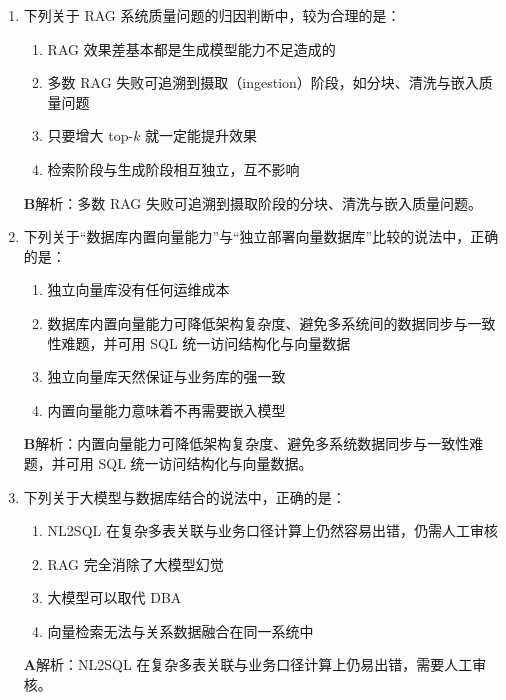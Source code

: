 \documentclass[UTF8,a4paper,11pt]{ctexart}
\newenvironment{answer}%
  {\begin{ans}\noindent{\bfseries\color{ansframe}【答案】}\hspace{0.4em}}%
  {\end{ans}}
\begin{document}
\begin{enumerate}
\item 下列关于 RAG 系统质量问题的归因判断中，较为合理的是：
\begin{enumerate}[label=\Alph*., leftmargin=2.2em, itemsep=1pt]
\item RAG 效果差基本都是生成模型能力不足造成的
\item 多数 RAG 失败可追溯到摄取（ingestion）阶段，如分块、清洗与嵌入质量问题
\item 只要增大 top-$k$ 就一定能提升效果
\item 检索阶段与生成阶段相互独立，互不影响
\end{enumerate}
\begin{answer}
\textbf{B}\quad 解析：多数 RAG 失败可追溯到摄取阶段的分块、清洗与嵌入质量问题。
\end{answer}

\item 下列关于“数据库内置向量能力”与“独立部署向量数据库”比较的说法中，正确的是：
\begin{enumerate}[label=\Alph*., leftmargin=2.2em, itemsep=1pt]
\item 独立向量库没有任何运维成本
\item 数据库内置向量能力可降低架构复杂度、避免多系统间的数据同步与一致性难题，并可用 SQL 统一访问结构化与向量数据
\item 独立向量库天然保证与业务库的强一致
\item 内置向量能力意味着不再需要嵌入模型
\end{enumerate}
\begin{answer}
\textbf{B}\quad 解析：内置向量能力可降低架构复杂度、避免多系统数据同步与一致性难题，并可用 SQL 统一访问结构化与向量数据。
\end{answer}

\item 下列关于大模型与数据库结合的说法中，正确的是：
\begin{enumerate}[label=\Alph*., leftmargin=2.2em, itemsep=1pt]
\item NL2SQL 在复杂多表关联与业务口径计算上仍然容易出错，仍需人工审核
\item RAG 完全消除了大模型幻觉
\item 大模型可以取代 DBA
\item 向量检索无法与关系数据融合在同一系统中
\end{enumerate}
\begin{answer}
\textbf{A}\quad 解析：NL2SQL 在复杂多表关联与业务口径计算上仍易出错，需要人工审核。
\end{answer}

\end{enumerate}
\end{document}

